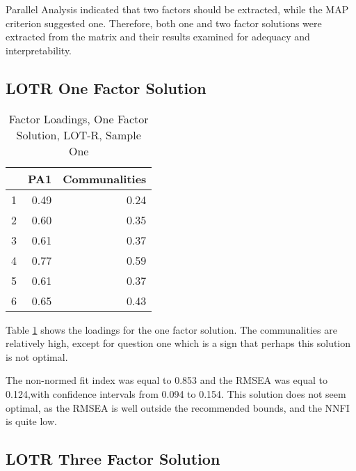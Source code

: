 \documentclass{article}
\begin{document}
Parallel Analysis indicated that two factors should be extracted, while the MAP criterion suggested one.  Therefore, both one and two factor solutions were extracted from the matrix and their results examined for adequacy and interpretability.

\subsection{LOTR One Factor Solution}
\label{sec:lotr-one-factor}


\begin{table}[ht]
\centering
\begin{tabular}{rrr}
  \hline
 & PA1 & Communalities \\ 
  \hline
1 & 0.49 & 0.24 \\ 
  2 & 0.60 & 0.35 \\ 
  3 & 0.61 & 0.37 \\ 
  4 & 0.77 & 0.59 \\ 
  5 & 0.61 & 0.37 \\ 
  6 & 0.65 & 0.43 \\ 
   \hline
\end{tabular}
\caption{Factor Loadings, One Factor Solution, LOT-R, Sample One} 
\label{tab:hom1lotr1fact}
\end{table}
Table \ref{tab:hom1lotr1fact} shows the loadings for the one factor solution. The communalities are relatively high, except for question one which is a sign that perhaps this solution is not optimal. 


The non-normed fit index was equal to 0.853
and the RMSEA was equal to 0.124,with confidence intervals from 0.094 to 0.154.  This solution does not seem optimal, as the RMSEA is well outside the recommended bounds, and the NNFI is quite low.  %




\subsection{LOTR Three Factor Solution}
\label{sec:lotr-three-factor}
\end{document}
